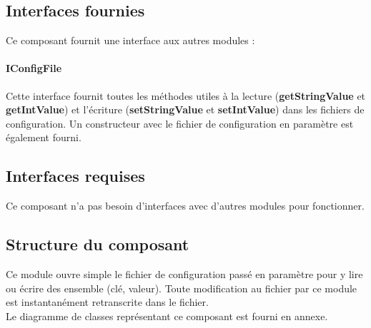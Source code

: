 \subsection{Interfaces fournies}

Ce composant fournit une interface aux autres modules :

\paragraph{IConfigFile}

Cette interface fournit toutes les méthodes utiles à la lecture (\textbf{getStringValue} et \textbf{getIntValue}) et l'écriture (\textbf{setStringValue} et \textbf{setIntValue}) dans les fichiers de configuration. Un constructeur avec le fichier de configuration en paramètre est également fourni.

\subsection{Interfaces requises}

Ce composant n'a pas besoin d'interfaces avec d'autres modules pour fonctionner.

\subsection{Structure du composant}

Ce module ouvre simple le fichier de configuration passé en paramètre pour y lire ou écrire des ensemble (clé, valeur). Toute modification au fichier par ce module est instantanément retranscrite dans le fichier.\\

Le diagramme de classes représentant ce composant est fourni en annexe.